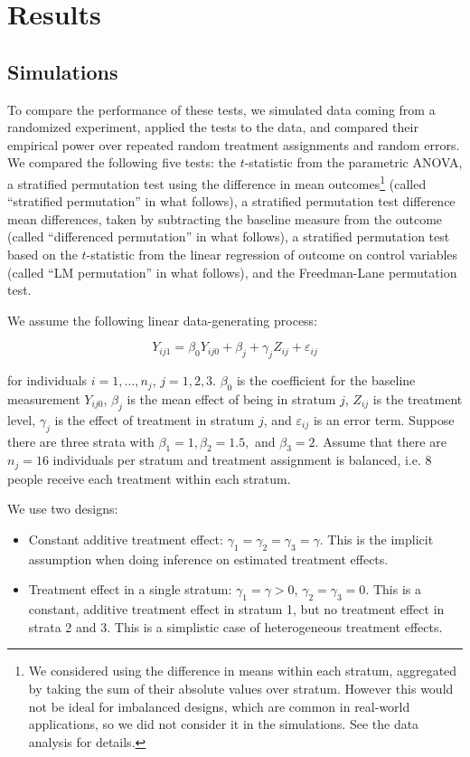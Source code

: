 \documentclass[11pt]{article}
\begin{document}
\section{Results}
\subsection{Simulations}

To compare the performance of these tests, we simulated data coming from a randomized experiment, applied the tests to the data, and compared their empirical power over repeated random treatment assignments and random errors.
We compared the following five tests:
the $t$-statistic from the parametric ANOVA,
a stratified permutation test using the difference in mean outcomes\footnote{ We considered using the difference in means within each stratum, aggregated by taking the sum of their absolute values over stratum. However this would not be ideal for imbalanced designs, which are common in real-world applications, so we did not consider it in the simulations.  See the data analysis for details.}
 (called ``stratified permutation'' in what follows),
a stratified permutation test difference mean differences, taken by subtracting the baseline measure from the outcome (called ``differenced permutation'' in what follows),
a stratified permutation test based on the $t$-statistic from the linear regression of outcome on control variables (called ``LM permutation'' in what follows),
and the Freedman-Lane permutation test.
 

We assume the following linear data-generating process:

$$Y_{ij1} =\beta_0Y_{ij0} + \beta_{j} + \gamma_j Z_{ij} + \varepsilon_{ij}$$

for individuals $i = 1, \dots, n_j$, $j = 1, 2, 3$.
$\beta_0$ is the coefficient for the baseline measurement $Y_{ij0}$, 
$\beta_j$ is the mean effect of being in stratum $j$, 
$Z_{ij}$ is the treatment level, 
$\gamma_j$ is the effect of treatment in stratum $j$, 
and $\varepsilon_{ij}$ is an error term.
Suppose there are three strata with $\beta_1 = 1, \beta_2 = 1.5,$ and $\beta_3 = 2$.
Assume that there are $n_j = 16$ individuals per stratum and treatment assignment is balanced, i.e. 8 people receive each treatment within each stratum.

We use two designs:
\begin{itemize}
\item Constant additive treatment effect: $\gamma_1 = \gamma_2 = \gamma_3 = \gamma$. This is the implicit assumption when doing inference on estimated treatment effects.
\item Treatment effect in a single stratum: $\gamma_1 = \gamma > 0$, $\gamma_2 = \gamma_3 = 0$. This is a constant, additive treatment effect in stratum 1, but no treatment effect in strata 2 and 3. This is a simplistic case of heterogeneous treatment effects.
\end{itemize}
\end{document}
